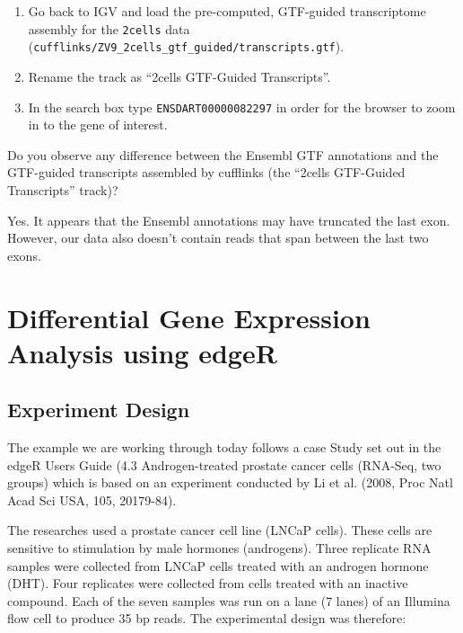 \begin{steps}
\begin{enumerate}
  \item Go back to IGV and load the pre-computed, GTF-guided transcriptome
  assembly for the \texttt{2cells} data
  (\texttt{cufflinks/ZV9\_2cells\_gtf\_guided/transcripts.gtf}).
  \item Rename the track as ``2cells GTF-Guided Transcripts''.
  \item In the search box type \texttt{ENSDART00000082297} in order for the
  browser to zoom in to the gene of interest.
\end{enumerate}
\end{steps}

\begin{questions}
Do you observe any difference between the Ensembl GTF annotations and the
GTF-guided transcripts assembled by cufflinks (the ``2cells GTF-Guided Transcripts'' track)?
\begin{answer}
Yes. It appears that the Ensembl annotations may have truncated the last exon.
However, our data also doesn't contain reads that span between the last two
exons.
\end{answer}

\end{questions}



\newpage
\section{Differential Gene Expression Analysis using edgeR}

\subsection{Experiment Design}
The example we are working through today follows a case Study set out in the edgeR Users
Guide (4.3 Androgen-treated prostate cancer cells (RNA-Seq, two groups) which is based on
an experiment conducted by Li et al. (2008, Proc Natl Acad Sci USA, 105, 20179-84).

The researches used a prostate cancer cell line (LNCaP cells). These cells are sensitive
to stimulation by male hormones (androgens). Three replicate RNA samples were collected
from LNCaP cells treated with an androgen hormone (DHT). Four replicates were collected
from cells treated with an inactive compound. Each of the seven samples was run on a
lane (7 lanes) of an Illumina flow cell to produce 35 bp reads. The experimental design
was therefore:

